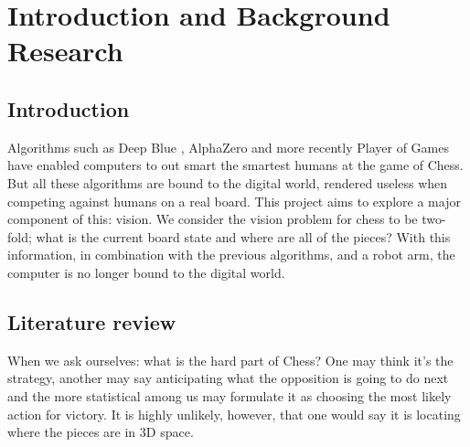 \chapter{Introduction and Background Research}

\label{chapter1}

\section{Introduction}

Algorithms such as Deep Blue \cite{parikh1980adaptive}, AlphaZero \cite{} and more recently Player of Games\cite{}
have enabled computers to out smart the smartest humans at the game of Chess.
But all these algorithms are bound to the digital world, rendered useless when
competing against humans on a real board. This project aims to explore a major
component of this: vision.
We consider the vision problem for chess to be two-fold; what is the current board
state and where are all of the pieces?  With this information, in combination with the
previous algorithms, and a robot arm, the computer is no longer bound to the
digital world.

\section{Literature review}
When we ask ourselves: what is the hard part of Chess?  
One may think it's the strategy, another may say anticipating what the opposition
is going to do next and the more statistical among us may formulate it as choosing the most likely action for victory.  
It is highly unlikely, however, that one would say it is locating where the pieces are in 3D space.

